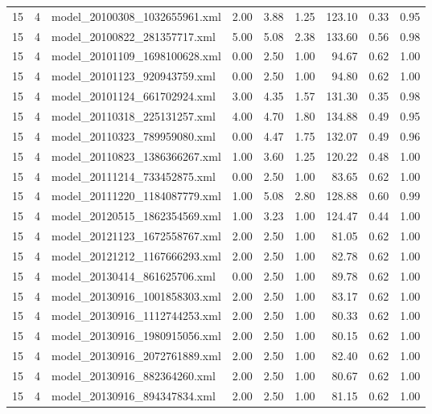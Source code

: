 \begin{table}[ht]
\begin{tabular}{rrlrrrrrr}
   15 &   4 & model\_20100308\_1032655961.xml & 2.00 & 3.88 & 1.25 & 123.10 & 0.33 & 0.95 \\ 
   15 &   4 & model\_20100822\_281357717.xml & 5.00 & 5.08 & 2.38 & 133.60 & 0.56 & 0.98 \\ 
   15 &   4 & model\_20101109\_1698100628.xml & 0.00 & 2.50 & 1.00 & 94.67 & 0.62 & 1.00 \\ 
   15 &   4 & model\_20101123\_920943759.xml & 0.00 & 2.50 & 1.00 & 94.80 & 0.62 & 1.00 \\ 
   15 &   4 & model\_20101124\_661702924.xml & 3.00 & 4.35 & 1.57 & 131.30 & 0.35 & 0.98 \\ 
   15 &   4 & model\_20110318\_225131257.xml & 4.00 & 4.70 & 1.80 & 134.88 & 0.49 & 0.95 \\ 
   15 &   4 & model\_20110323\_789959080.xml & 0.00 & 4.47 & 1.75 & 132.07 & 0.49 & 0.96 \\ 
   15 &   4 & model\_20110823\_1386366267.xml & 1.00 & 3.60 & 1.25 & 120.22 & 0.48 & 1.00 \\ 
   15 &   4 & model\_20111214\_733452875.xml & 0.00 & 2.50 & 1.00 & 83.65 & 0.62 & 1.00 \\ 
   15 &   4 & model\_20111220\_1184087779.xml & 1.00 & 5.08 & 2.80 & 128.88 & 0.60 & 0.99 \\ 
   15 &   4 & model\_20120515\_1862354569.xml & 1.00 & 3.23 & 1.00 & 124.47 & 0.44 & 1.00 \\ 
   15 &   4 & model\_20121123\_1672558767.xml & 2.00 & 2.50 & 1.00 & 81.05 & 0.62 & 1.00 \\ 
   15 &   4 & model\_20121212\_1167666293.xml & 2.00 & 2.50 & 1.00 & 82.78 & 0.62 & 1.00 \\ 
   15 &   4 & model\_20130414\_861625706.xml & 0.00 & 2.50 & 1.00 & 89.78 & 0.62 & 1.00 \\ 
   15 &   4 & model\_20130916\_1001858303.xml & 2.00 & 2.50 & 1.00 & 83.17 & 0.62 & 1.00 \\ 
   15 &   4 & model\_20130916\_1112744253.xml & 2.00 & 2.50 & 1.00 & 80.33 & 0.62 & 1.00 \\ 
   15 &   4 & model\_20130916\_1980915056.xml & 2.00 & 2.50 & 1.00 & 80.15 & 0.62 & 1.00 \\ 
   15 &   4 & model\_20130916\_2072761889.xml & 2.00 & 2.50 & 1.00 & 82.40 & 0.62 & 1.00 \\ 
   15 &   4 & model\_20130916\_882364260.xml & 2.00 & 2.50 & 1.00 & 80.67 & 0.62 & 1.00 \\ 
   15 &   4 & model\_20130916\_894347834.xml & 2.00 & 2.50 & 1.00 & 81.15 & 0.62 & 1.00 \\ 

\end{tabular}
\end{table}
